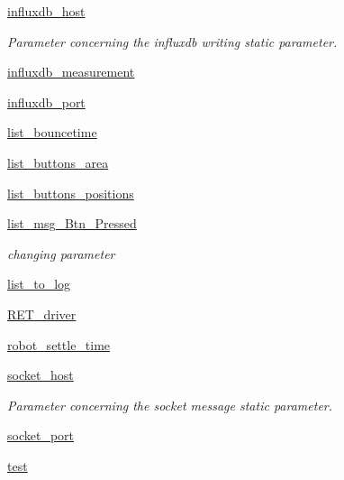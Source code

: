 \begin{DoxyCompactItemize}
\item 
\hyperlink{classRET__Parameter_1_1RET__Parameter_a2c910a8a000ce837b18cf2959297dcce}{influxdb\+\_\+host}
\begin{DoxyCompactList}\small\item\em Parameter concerning the influxdb writing static parameter. \end{DoxyCompactList}\item 
\hyperlink{classRET__Parameter_1_1RET__Parameter_a2951333e048b79a878571eafd1eee541}{influxdb\+\_\+measurement}
\item 
\hyperlink{classRET__Parameter_1_1RET__Parameter_a0d892e15d9fa78818d4495560d962ec2}{influxdb\+\_\+port}
\item 
\hyperlink{classRET__Parameter_1_1RET__Parameter_a19e1c5b8812bb41ecaa59c174a9cc027}{list\+\_\+bouncetime}
\item 
\hyperlink{classRET__Parameter_1_1RET__Parameter_ac4848af5696d2d98e426d3d775d6964d}{list\+\_\+buttons\+\_\+area}
\item 
\hyperlink{classRET__Parameter_1_1RET__Parameter_ae07c53483c9c3ff8611ec4d7401fa71f}{list\+\_\+buttons\+\_\+positions}
\item 
\hyperlink{classRET__Parameter_1_1RET__Parameter_a356b7bcae5e020489b6db1128e16d11b}{list\+\_\+msg\+\_\+\+Btn\+\_\+\+Pressed}
\begin{DoxyCompactList}\small\item\em changing parameter \end{DoxyCompactList}\item 
\hyperlink{classRET__Parameter_1_1RET__Parameter_af4093e533290b780aa3d5611f6a8a526}{list\+\_\+to\+\_\+log}
\item 
\hyperlink{classRET__Parameter_1_1RET__Parameter_accada53c1f876f08e9c5beb661846ca1}{R\+E\+T\+\_\+driver}
\item 
\hyperlink{classRET__Parameter_1_1RET__Parameter_a153ea6721b57c14eea55728d46eae779}{robot\+\_\+settle\+\_\+time}
\item 
\hyperlink{classRET__Parameter_1_1RET__Parameter_afc570ca4c1952bb0a14a0511160df54a}{socket\+\_\+host}
\begin{DoxyCompactList}\small\item\em Parameter concerning the socket message static parameter. \end{DoxyCompactList}\item 
\hyperlink{classRET__Parameter_1_1RET__Parameter_a736f9eb916b0d398d68fc3e0c8f3f953}{socket\+\_\+port}
\item 
\hyperlink{classRET__Parameter_1_1RET__Parameter_a05a671c66aefea124cc08b76ea6d30bb}{test}

\end{DoxyCompactItemize}
